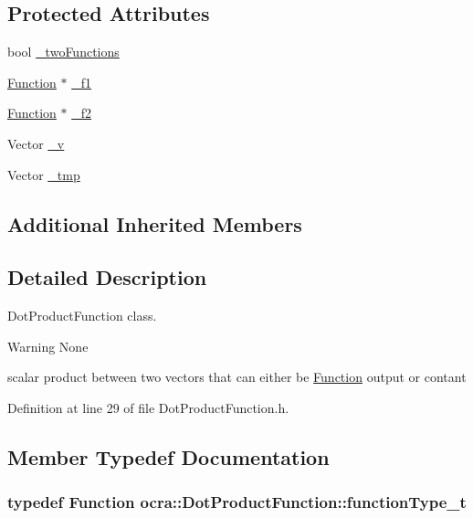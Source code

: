 \subsection*{Protected Attributes}
\begin{DoxyCompactItemize}
\item 
bool \hyperlink{classocra_1_1DotProductFunction_a8450996eff9607045cf57a4502ff0944}{\+\_\+two\+Functions}
\item 
\hyperlink{classocra_1_1Function}{Function} $\ast$ \hyperlink{classocra_1_1DotProductFunction_a3e39a9ce09fc27131afbe8e7a6758681}{\+\_\+f1}
\item 
\hyperlink{classocra_1_1Function}{Function} $\ast$ \hyperlink{classocra_1_1DotProductFunction_a7de350aefad539fdd84453b11019e936}{\+\_\+f2}
\item 
Vector \hyperlink{classocra_1_1DotProductFunction_a6405d1f78159e5fc16801bd73eb32a68}{\+\_\+v}
\item 
Vector \hyperlink{classocra_1_1DotProductFunction_a82d2cb16e4b9b6d50e59fabfb25fc222}{\+\_\+tmp}
\end{DoxyCompactItemize}
\subsection*{Additional Inherited Members}


\subsection{Detailed Description}
Dot\+Product\+Function class. 

\begin{DoxyWarning}{Warning}
None
\end{DoxyWarning}
scalar product between two vectors that can either be \hyperlink{classocra_1_1Function}{Function} output or contant 

Definition at line 29 of file Dot\+Product\+Function.\+h.



\subsection{Member Typedef Documentation}
\subsubsection[{\texorpdfstring{function\+Type\+\_\+t}{functionType_t}}]{\setlength{\rightskip}{0pt plus 5cm}typedef {\bf Function} {\bf ocra\+::\+Dot\+Product\+Function\+::function\+Type\+\_\+t}}\hypertarget{classocra_1_1DotProductFunction_abdc60b6380ffedc075792224bd908c48}{}\label{classocra_1_1DotProductFunction_abdc60b6380ffedc075792224bd908c48}


